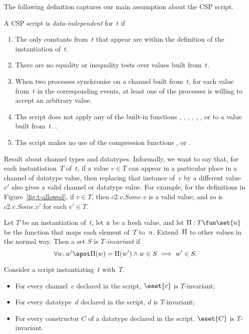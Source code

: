 The following definition captures our main assumption about the CSP script.
%
\begin{definition}
\label{defn:data-independent}
A CSP script is \emph{data-independent} for~$t$ if
\begin{enumerate}
\item The only constants from~$t$ that appear are within the definition
  of the instantiation of~$t$.

\item There are no equality or inequality tests over values built from~$t$.

\item When two processes synchronise on a channel built from~$t$, for each
  value from~$t$ in the corresponding events, at least one of the processes is
  willing to accept an arbitrary value.

\item The script does not apply any of the built-in functions ,
  , , , , ,
   or  to a value built from~$t$.
  \framebox{\ldots}. 

\item The script makes no use of the compression functions ,
   or .
\end{enumerate}
\end{definition}

Result about channel types and datatypes.  Informally, we want to say that,
for each instantiation~$T$ of~$t$, if a value $v \in T$ can appear in a
particular place in a channel of datatype value, then replacing that instance
of~$v$ by a different value~$v'$ also gives a valid channel or datatype
value.  For example, for the definitions in Figure~\ref{fig:t-allowed}, if $v
\in T$, then $c2.v.Some.v$ is a valid value; and so is $c2.v.Some.v'$ for each
$v' \in T$. 

\begin{definition}
Let $T$ be an instantiation of~$t$, let $u$ be a fresh value, and let
$\unitf : T \fun \set{\unit}$ be the function that maps each element of~$T$
to~$u$. Extend~$\Pi$ to other values in the normal way.  Then a set $S$
is \emph{$T$-invariant} if
\[
\forall w, w' \spot
  \unitf(w) = \unitf(w') \land w \in S  \implies w' \in S.
\]
\end{definition}

\begin{lemma}
\label{lem:T-invariant}
Consider a script instantiating~$t$ with~$T$.
%
\begin{itemize}
\item For every channel~$c$ declared in the script, $\eset{c}$ is $T$-invariant;

\item For every datatype~$d$ declared in the script, $d$ is
  $T$-invariant;

\item For every constructor $C$ of a datatype declared in the script,
  $\eset{C}$  is $T$-invariant.
\end{itemize}
\end{lemma}

